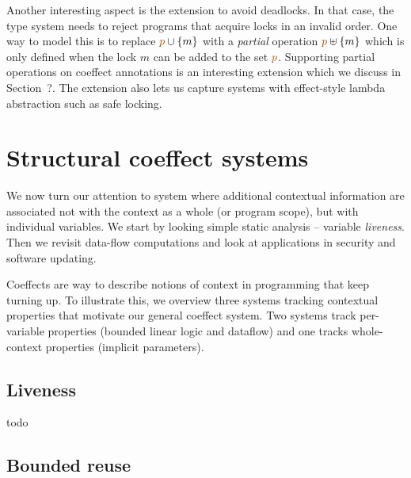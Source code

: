 Another interesting aspect is the extension to avoid deadlocks. In that case, the type system
needs to reject programs that acquire locks in an invalid order. One way to model this is to 
replace $\aclrd{p} \cup \{m\}$ with a \emph{partial} operation $\aclrd{p} \uplus \{m\}$ which
is only defined when the lock $m$ can be added to the set $\aclrd{p}$. Supporting partial 
operations on coeffect annotations is an interesting extension which we discuss in Section~?.
The extension also lets us capture systems with effect-style lambda abstraction such as safe
locking.


\section{Structural coeffect systems}

We now turn our attention to system where additional contextual information are associated not
with the context as a whole (or program scope), but with individual variables. We start by looking
simple static analysis -- variable \emph{liveness}. Then we revisit data-flow computations and
look at applications in security and software updating.


Coeffects are way to describe notions of context in programming that keep turning up. 
To illustrate this, we overview three systems tracking contextual properties that 
 motivate our general coeffect system. Two systems track per-variable properties (bounded 
linear logic and dataflow) and one tracks whole-context properties (implicit parameters).


\subsection{Liveness}
\label{sec:applications-struct-live}

todo


\subsection{Bounded reuse}

